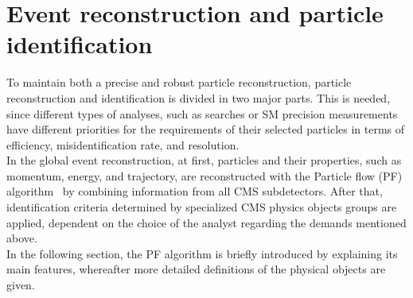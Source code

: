 \section{Event reconstruction and particle identification}\label{sec:reco}
To maintain both a precise and robust particle reconstruction, particle reconstruction and identification is divided in two major parts. This is needed, since different types of analyses, such as searches or SM precision measurements have different priorities for the requirements of their selected particles in terms of efficiency, misidentification rate, and resolution.\\
In the global event reconstruction, at first, particles and their properties, such as momentum, energy, and trajectory, are reconstructed with the Particle flow (PF) algorithm~\cite{ParticleFlow} by combining information from all CMS subdetectors. After that, identification criteria determined by specialized CMS physics objects groups are applied, dependent on the choice of the analyst regarding the demands mentioned above.\\
In the following section, the PF algorithm is briefly introduced by explaining its main features, whereafter more detailed definitions of the physical objects are given.

